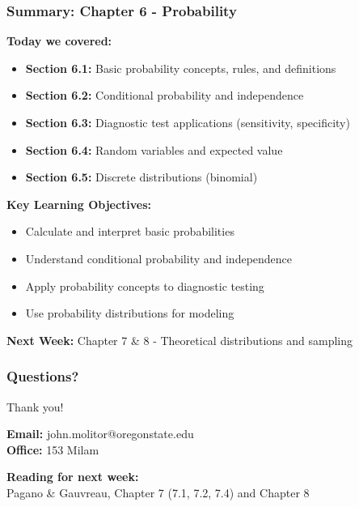 \documentclass{beamer}
\begin{document}
\begin{frame}
\frametitle{Summary: Chapter 6 - Probability}
\textbf{Today we covered:}
\begin{itemize}
\item \textbf{Section 6.1:} Basic probability concepts, rules, and definitions
\item \textbf{Section 6.2:} Conditional probability and independence
\item \textbf{Section 6.3:} Diagnostic test applications (sensitivity, specificity)
\item \textbf{Section 6.4:} Random variables and expected value
\item \textbf{Section 6.5:} Discrete distributions (binomial)
\end{itemize}

\vspace{0.5cm}
\textbf{Key Learning Objectives:}
\begin{itemize}
\item Calculate and interpret basic probabilities
\item Understand conditional probability and independence
\item Apply probability concepts to diagnostic testing
\item Use probability distributions for modeling
\end{itemize}

\vspace{0.5cm}
\textbf{Next Week:} Chapter 7 \& 8 - Theoretical distributions and sampling
\end{frame}

\begin{frame}
\frametitle{Questions?}
\begin{center}
\Large{Thank you!}

\vspace{1cm}

\textbf{Email:} john.molitor@oregonstate.edu\\
\textbf{Office:} 153 Milam

\vspace{1cm}

\textbf{Reading for next week:}\\
Pagano \& Gauvreau, Chapter 7 (7.1, 7.2, 7.4) and Chapter 8
\end{center}
\end{frame}
\end{document}
